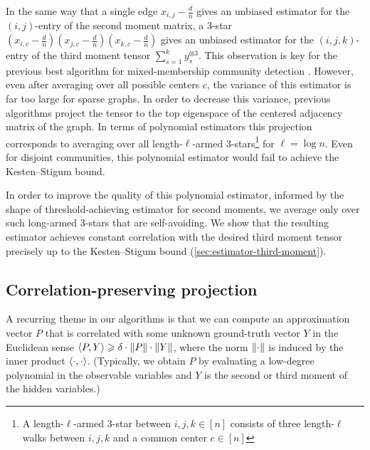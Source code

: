 In the same way that a single edge $x_{i,j}-\tfrac dn$ gives an unbiased estimator for the $(i,j)$-entry of the second moment matrix, a 3-star $(x_{i,c}-\tfrac d n)(x_{j,c}-\tfrac d n)(x_{k,c}-\tfrac dn)$ gives an unbiased estimator for the $(i,j,k)$-entry of the third moment tensor $\sum_{s=1}^k y_s^{\otimes 3}$.
This observation is key for the previous best algorithm for mixed-membership community detection \cite{DBLP:conf/colt/AnandkumarGHK13}.
However, even after averaging over all possible centers $c$, the variance of this estimator is far too large for sparse graphs.
In order to decrease this variance, previous algorithms  \cite{DBLP:conf/colt/AnandkumarGHK13} project the tensor to the top eigenspace of the centered adjacency matrix of the graph.
In terms of polynomial estimators this projection corresponds to averaging over all length-$\ell$-armed 3-stars\footnote{A length-$\ell$-armed 3-star between $i,j,k\in [n]$ consists of three length-$\ell$ walks between $i,j,k$ and a common center $c\in [n]$} for $\ell=\log n$.
Even for disjoint communities, this polynomial estimator would fail to achieve the Kesten--Stigum bound.

In order to improve the quality of this polynomial estimator, informed by the shape of threshold-achieving estimator for second moments, we average only over such long-armed 3-stars that are self-avoiding.
We show that the resulting estimator achieves constant correlation with the desired third moment tensor precisely up to the Kesten--Stigum bound (\cref{sec:estimator-third-moment}).

\subsection{Correlation-preserving projection}

A recurring theme in our algorithms is that we can compute an approximation vector $P$ that is correlated with some unknown ground-truth vector $Y$ in the Euclidean sense $\langle P,Y\rangle\geqslant \delta\cdot \lVert P\rVert\cdot \lVert Y\rVert$, where the norm $\lVert\cdot\rVert$ is induced by the inner product $\langle\cdot,\cdot\rangle$.
(Typically, we obtain $P$ by evaluating a low-degree polynomial in the observable variables and $Y$ is the second or third moment of the hidden variables.)

